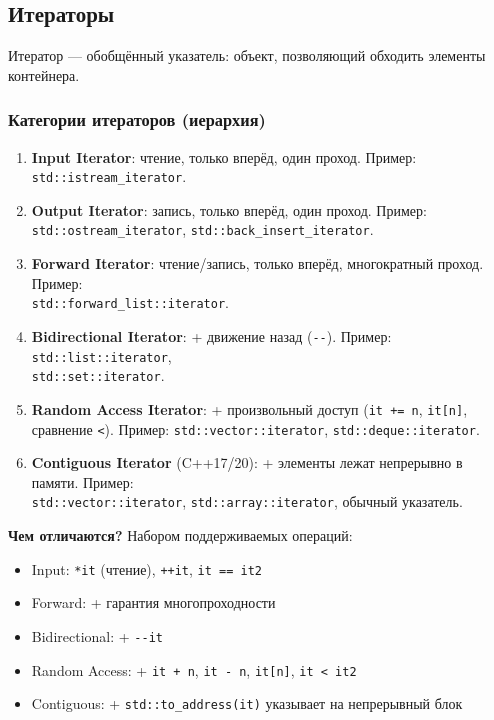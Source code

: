 \documentclass[12pt,a4paper]{article}
\begin{document}
\subsection{Итераторы}

Итератор --- обобщённый указатель: объект, позволяющий обходить элементы контейнера.

\subsubsection{Категории итераторов (иерархия)}

\begin{enumerate}
    \item \textbf{Input Iterator}: чтение, только вперёд, один проход. Пример: \texttt{std::istream\_iterator}.
    \item \textbf{Output Iterator}: запись, только вперёд, один проход. Пример: \texttt{std::ostream\_iterator}, \texttt{std::back\_insert\_iterator}.
    \item \textbf{Forward Iterator}: чтение/запись, только вперёд, многократный проход. Пример: \\\texttt{std::forward\_list::iterator}.
    \item \textbf{Bidirectional Iterator}: + движение назад (\texttt{-{}-}). Пример: \texttt{std::list::iterator}, \\\texttt{std::set::iterator}.
    \item \textbf{Random Access Iterator}: + произвольный доступ (\texttt{it += n}, \texttt{it[n]}, сравнение \texttt{<}). Пример: \texttt{std::vector::iterator}, \texttt{std::deque::iterator}.
    \item \textbf{Contiguous Iterator} (C++17/20): + элементы лежат непрерывно в памяти. Пример: \\\texttt{std::vector::iterator}, \texttt{std::array::iterator}, обычный указатель.
\end{enumerate}

\textbf{Чем отличаются?} Набором поддерживаемых операций:
\begin{itemize}
    \item Input: \texttt{*it} (чтение), \texttt{++it}, \texttt{it == it2}
    \item Forward: + гарантия многопроходности
    \item Bidirectional: + \texttt{-{}-it}
    \item Random Access: + \texttt{it + n}, \texttt{it - n}, \texttt{it[n]}, \texttt{it < it2}
    \item Contiguous: + \texttt{std::to\_address(it)} указывает на непрерывный блок
\end{itemize}
\end{document}
